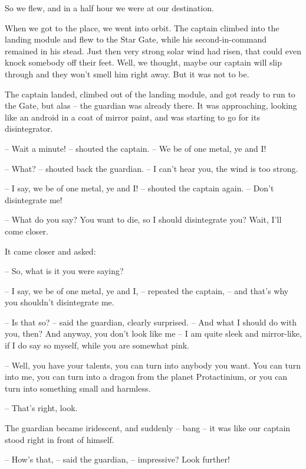 \documentclass[ebook,oneside,final,openright]{memoir}
\begin{document}
So we flew, and in a half hour we were at our destination.\par
\par
When we got to the place, we went into orbit. The captain climbed into the landing module and flew to the Star Gate, while his second-in-command remained in his stead. Just then very strong solar wind had risen, that could even knock somebody off their feet. Well, we thought, maybe our captain will slip through and they won’t smell him right away. But it was not to be.\par
\par
The captain landed, climbed out of the landing module, and got ready to run to the Gate, but alas – the guardian was already there. It was approaching, looking like an android in a coat of mirror paint, and was starting to go for its disintegrator.\par
– Wait a minute! – shouted the captain. – We be of one metal, ye and I!\par
– What? – shouted back the guardian. – I can’t hear you, the wind is too strong.\par
– I say, we be of one metal, ye and I! – shouted the captain again. – Don’t disintegrate me!\par
– What do you say? You want to die, so I should disintegrate you? Wait, I’ll come closer.\par
\par
It came closer and asked:\par
– So, what is it you were saying?\par
– I say, we be of one metal, ye and I, – repeated the captain, – and that’s why you shouldn’t disintegrate me.\par
– Is that so? – said the guardian, clearly surprised. – And what I should do with you, then? And anyway, you don’t look like me – I am quite sleek and mirror-like, if I do say so myself, while you are somewhat pink.\par
– Well, you have your talents, you can turn into anybody you want. You can turn into me, you can turn into a dragon from the planet Protactinium, or you can turn into something small and harmless.\par
– That’s right, look.\par
\par
The guardian became iridescent, and suddenly – bang – it was like our captain stood right in front of himself.\par
– How’s that, – said the guardian, – impressive? Look further!\par
\end{document}
